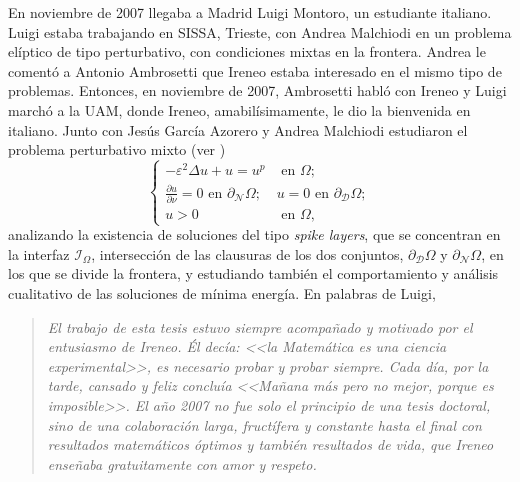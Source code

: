 En noviembre de 2007  llegaba  a Madrid Luigi Montoro, un estudiante italiano. Luigi estaba trabajando en  SISSA, Trieste, con Andrea Malchiodi en un problema el\'iptico de tipo perturbativo, con condiciones mixtas en la frontera.
	Andrea le coment\'o a Antonio Ambrosetti que Ireneo estaba interesado en el mismo tipo de problemas. Entonces, en noviembre de 2007, Ambrosetti habl\'o con Ireneo y Luigi march\'o a la UAM, donde Ireneo, amabil\'isimamente, le dio la bienvenida en italiano. Junto con Jes\'us Garc\'ia Azorero y Andrea Malchiodi estudiaron el problema perturbativo mixto {(ver \cite{GMMPI})}
	\begin{equation}\nonumber
	\begin{cases}
	-\varepsilon^2 \Delta u + u = u^p & \text{ en } \Omega; \\
	\frac{\partial u}{\partial \nu} = 0 \text{ en } \partial_{\mathcal{N}} \Omega; &
	u = 0  \text{ en } \partial_{\mathcal{D}} \Omega;
	\\ u > 0 & \text{ en } \Omega,
	\end{cases}
	\end{equation}	
	analizando la existencia de soluciones del tipo \textit{spike layers}, que se concentran en la interfaz $\mathcal{I}_\Omega$, intersecci\'on de las clausuras de los dos conjuntos, $\partial_{\mathcal{D}} \Omega$ y $\partial_{\mathcal{N}} \Omega$, en los que se divide la frontera, y estudiando tambi\'en el comportamiento y an\'alisis cualitativo de las soluciones de m\'inima energ\'ia. En palabras de Luigi, 
	\begin{quote}
	\textit{El trabajo de esta tesis estuvo siempre acompa\~{n}ado y motivado por el entusiasmo de Ireneo. \'El dec\'ia: <<la Matem\'atica es una ciencia experimental>>, es necesario probar y probar siempre. Cada d\'ia, por la tarde, cansado y feliz conclu\'ia <<Ma\~{n}ana m\'as pero no mejor, porque es imposible>>.
	El a\~no 2007 no fue solo el principio de una tesis doctoral, sino de una colaboraci\'on larga, fruct\'ifera y constante hasta el final con resultados matem\'aticos \'optimos 
y tambi\'en resultados de vida, que Ireneo ense\~{n}aba gratuitamente con amor y respeto.}
\end{quote}

